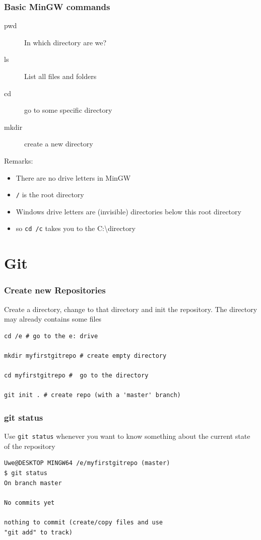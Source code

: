 \documentclass[12pt,english]{beamer}
\begin{document}
\begin{frame}
\frametitle{Basic MinGW commands}

\begin{description}
\item [pwd] In which directory are we?
\item [ls] List all files and folders
\item [cd] go to some specific directory
\item [mkdir] create a new directory
\end{description}

Remarks:

\begin{itemize}
\item There are no drive letters in MinGW
\item \texttt{/} is the root directory
\item Windows drive letters are (invisible) directories below this root directory
\item so \texttt{cd /c} takes you to the C:\textbackslash directory
\end{itemize}

\end{frame}

\section{Git}

\begin{frame}[containsverbatim]
\frametitle{Create new Repositories}

Create a directory, change to that directory and init the repository. The directory may already contains some files

\begin{lstlisting}
cd /e # go to the e: drive

mkdir myfirstgitrepo # create empty directory

cd myfirstgitrepo #  go to the directory

git init . # create repo (with a 'master' branch)
\end{lstlisting}

\end{frame}

\begin{frame}[containsverbatim]
\frametitle{git status}

Use \texttt{git status} whenever you want to know something about the current state of the repository

\begin{lstlisting}
Uwe@DESKTOP MINGW64 /e/myfirstgitrepo (master)
$ git status
On branch master

No commits yet

nothing to commit (create/copy files and use
"git add" to track)
\end{lstlisting}

\end{frame}
\end{document}
